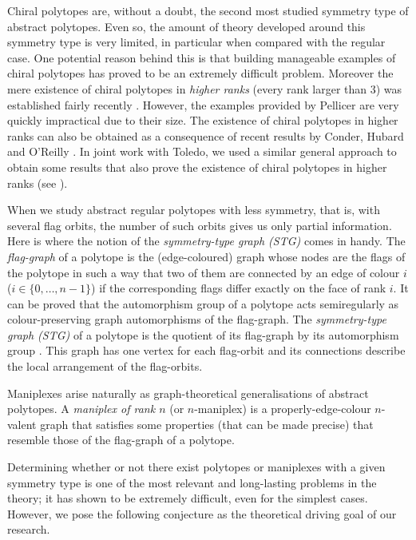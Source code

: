 Chiral polytopes are, without a doubt, the second most studied symmetry type of abstract polytopes. 
Even so, the amount of theory developed around this symmetry type is very limited, in particular when compared with the regular case. 
One potential reason behind this is that building manageable examples of chiral polytopes has proved to be an extremely difficult problem. 
Moreover the mere existence of chiral polytopes in \emph{higher ranks} (every rank larger than $3$) was established fairly recently \cite{Pellicer2010_ConstructionHigherRank}. 
However, the examples provided by Pellicer are very quickly impractical due to their size.
The existence of chiral polytopes in higher ranks can also be obtained as a consequence of recent results by Conder, Hubard and O'Reilly \cite*{CondHubORe2024_ConstructionChiralPolytopes}.
In joint work with Toledo, we used a similar general approach to obtain some results that also prove the existence of chiral polytopes in higher ranks (see \cite{MonteToled_ChiralExtensionsRegular_preprint}). 

When we study abstract regular polytopes with less symmetry, that is, with several flag orbits, the number of such orbits gives us only  partial information. 
Here is where the notion of the \emph{symmetry-type graph (STG)} comes in handy. 
The \emph{flag-graph} of a polytope is the (edge-coloured) graph whose nodes are the flags of the polytope in such a way that two of them are connected by an edge of colour $i$ ($i \in \{0, \dots, n-1\}$) if the corresponding flags differ exactly on the face of rank $i$.
It can be proved that the automorphism group of a polytope acts semiregularly as colour-preserving graph automorphisms of the flag-graph. 
The \emph{symmetry-type graph (STG)} of a polytope is the quotient of its flag-graph by its automorphism group
\cite{CunDelHuTo2015_SymmetryTypeGraphs}.
This graph has one vertex for each flag-orbit and its connections describe the local arrangement of the flag-orbits. 

Maniplexes arise naturally as graph-theoretical generalisations of abstract polytopes. 
A \emph{maniplex of rank $n$} (or $n$-maniplex) is a properly-edge-colour $n$-valent graph that satisfies some properties (that can be made precise) that resemble those of the flag-graph of a polytope.

Determining whether or not there exist polytopes or maniplexes with a given symmetry type is one of the most relevant and long-lasting problems in the theory; it has shown to be extremely difficult, even for the simplest cases.
However, we pose the following conjecture as the theoretical driving goal of our research. 


